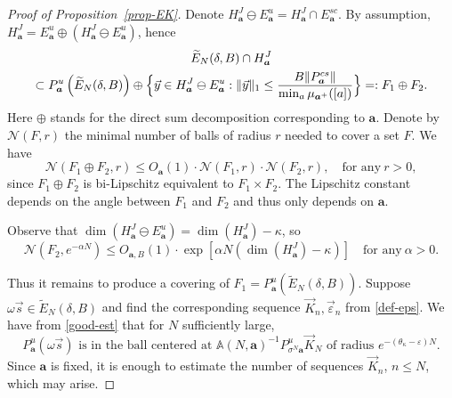 \documentclass[10pt]{amsart}
\newcommand{\sep}{:}
\let\epsilon\varepsilon
\theoremstyle{plain}
\theoremstyle{definition}
\let\wt\widetilde
\newcommand\bom{{\boldsymbol a}}\let\ba\bom
\let\eps\varepsilon
\let\om\omega
\let\sig\sigma
\newcommand\Ns{{\mathscr N}}
\newcommand\Aa{\mathbb{A}}
\newcommand\be{\begin{equation}}
\newcommand\ee{\end{equation}}
\begin{document}
\begin{proof}[Proof of Proposition~\ref{prop-EK}]
Denote $H_\bom^J \ominus E_\bom^u = H^J_{\bom}\cap E^{sc}_\bom$.
By assumption, $H_\bom^J = E^u_\bom \oplus (H_\bom^J \ominus E_\bom^u)$, hence
\begin{multline}
\label{eq-prod}
\wt E_N(\delta,B)\cap H_\bom^J\\
\subset P_\bom^u\left(\wt E_N(\delta,B)\right) \oplus \Bigl\{\vec y\in H_\bom^J \ominus E_\bom^u\sep \|\vec y\|_1 \le \frac{B\|P_\bom^{cs}\|}{\min_a\mu_{\bom^+}([a])}\Bigr\}=: F_1\oplus F_2.
\end{multline}
Here $\oplus$ stands for the direct sum decomposition corresponding to $\bom$. Denote by $\Ns(F,r)$ the minimal number of balls of radius $r$ needed to cover a set $F$. We have
\be \label{eq-produ2}
\Ns(F_1\oplus F_2,r) \le O_\bom(1)\cdot \Ns(F_1,r)\cdot \Ns(F_2,r),\quad \text{for any}\ r>0,
\ee
since $F_1\oplus F_2$ is bi-Lipschitz equivalent to $F_1\times F_2$. The Lipschitz constant depends on the angle between $F_1$ and $F_2$ and thus only depends on $\ba$.

Observe that $\dim(H_\bom^J \ominus E_\bom^u)=\dim(H_\bom^J)-\kappa$, so
\be \label{cover1}
\Ns(F_2,e^{-\alpha N}) \le O_{\bom,B}(1)\cdot \exp\left[\alpha N (\dim(H_\bom^J)-\kappa)\right]\quad \text{for any}\ \alpha>0.
\ee

Thus it remains to produce a covering of $F_1=P_\bom^u(\wt E_N(\delta,B))$.
Suppose $\om\vec{s} \in \wt E_N(\delta,B)$ and find the
corresponding sequence $\vec K_{n}, \vec\eps_{n}$ from \eqref{def-eps}. We have from \eqref{good-est} that for $N$ sufficiently large,
\be \label{eqrad}
\text{$P_\bom^u(\om\vec s)$ is in the ball centered at $\Aa(N,\bom)^{-1} P_{\sig^N\bom}^u \vec{K}_N$ of radius $e^{-(\theta_\kappa-\epsilon)N}$.}
\ee
Since $\bom$ is fixed, it is enough to estimate
the number of sequences $\vec K_{n}$, $n\le N$, which may arise.


\end{proof}
\end{document}
